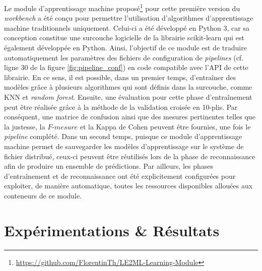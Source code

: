 Le module d'apprentissage machine proposé\footnote{\url{https://github.com/FlorentinTh/LE2ML-Learning-Module}} pour cette première version du \textit{workbench} a été conçu pour permettre l'utilisation d'algorithmes d'apprentissage machine traditionnels uniquement. Celui-ci a été développé en Python 3, car sa conception constitue une surcouche logicielle de la librairie scikit-learn qui est également développée en Python. Ainsi, l'objectif de ce module est de traduire automatiquement les paramètres des fichiers de configuration de \textit{pipelines} (cf. ligne 30 de la figure \ref{fig:pipeline_conf}) en code compatible avec l'\acs{API} de cette librairie. En ce sens, il est possible, dans un premier temps, d'entraîner des modèles grâce à plusieurs algorithmes qui sont définis dans la surcouche, comme \acl{KNN} et \textit{random forest}. Ensuite, une évaluation pour cette phase d'entraînement peut être réalisée grâce à la méthode de la validation croisée en 10-plis. Par conséquent, une matrice de confusion ainsi que des mesures pertinentes telles que la justesse, la $F\mbox{-} mesure$ et la Kappa de Cohen peuvent être fournies, une fois le \textit{pipeline} complété. Dans un second temps, puisque ce module d'apprentissage machine permet de sauvegarder les modèles d'apprentissage sur le système de fichier distribué, ceux-ci peuvent être réutilisés lors de la phase de reconnaissance afin de produire un ensemble de prédictions. Par ailleurs, les phases d'entraînement et de reconnaissance ont été explicitement configurées pour exploiter, de manière automatique, toutes les ressources disponibles allouées aux conteneurs de ce module.



\section{Expérimentations \& Résultats}

